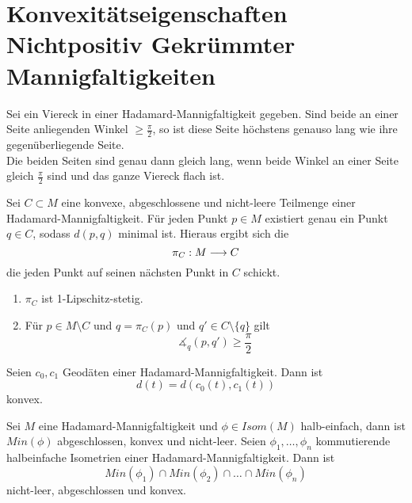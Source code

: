 \documentclass{book}
\begin{document}
\newpage
\section{Konvexitätseigenschaften Nichtpositiv Gekrümmter Mannigfaltigkeiten}
\Lem{}
Sei ein Viereck in einer Hadamard-Mannigfaltigkeit gegeben. Sind beide an einer Seite anliegenden Winkel $\geq \frac{\pi}{2}$, so ist diese Seite höchstens genauso lang wie ihre gegenüberliegende Seite.\\
Die beiden Seiten sind genau dann gleich lang, wenn beide Winkel an einer Seite gleich $\frac{\pi}{2}$ sind und das ganze Viereck flach ist.

\Prop{}
Sei $C \subset M$ eine konvexe, abgeschlossene und nicht-leere Teilmenge einer Hadamard-Mannigfaltigkeit. Für jeden Punkt $p \in M$ existiert
genau ein Punkt $q \in C$, sodass $d(p,q)$ minimal ist. Hieraus ergibt sich die 
\[ \pi_C : M \overset{}{\longrightarrow} C \]
die jeden Punkt auf seinen nächsten Punkt in $C$ schickt.

\Kor{}
\begin{enumerate}[1.)]
\item $\pi_C$ ist 1-Lipschitz-stetig.
\item Für $p \in M\setminus C$ und $q= \pi_C(p)$ und $q' \in C\setminus\{q\}$ gilt
\[ \measuredangle_{q}(p,q') \geq \frac{\pi}{2} \]
\end{enumerate}

\Prop{}
Seien $c_0,c_1$ Geodäten einer Hadamard-Mannigfaltigkeit. Dann ist
\[ d(t) = d(c_0(t), c_1(t)) \]
konvex.

\Lem{}
Sei $M$ eine Hadamard-Mannigfaltigkeit und $\phi \in Isom(M)$ halb-einfach, dann ist $Min(\phi)$ abgeschlossen, konvex und nicht-leer.
\Lem{}
Seien $\phi_1,\ldots, \phi_n$ kommutierende halbeinfache Isometrien einer Hadamard-Mannigfaltigkeit. Dann ist
\[Min(\phi_1)\cap Min(\phi_2) \cap \ldots \cap Min(\phi_n)\]
nicht-leer, abgeschlossen und konvex.
\end{document}
